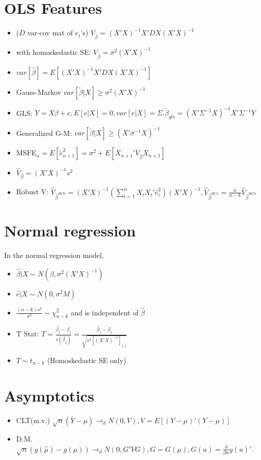 \documentclass[11pt]{article} %
\begin{document}
\section{OLS Features}
\begin{itemize}
\item ($D$ var-cov mat of $e_i$'s) $V_{\hat{\beta}} = (X'X)^{-1}X'DX(X'X)^{-1}$ 
\item with homoskedastic SE: $V_{\hat{\beta}} = \sigma^2 (X'X)^{-1}$
\item $var[\hat{\beta}] = E[(X'X)^{-1}X'DX(X'X)^{-1}]$
\item Gauss-Markov $var[\tilde{\beta} |X] \geq \sigma^2 (X'X)^{-1}$
\item GLS: $Y = X\beta + e, E[e|X] = 0, var[e|X] = \Sigma. \tilde{\beta}_{gls} = (X'\Sigma^{-1} X)^{-1} X'\Sigma ^{-1} Y$
\item Generalized G-M: $var[\tilde{\beta}|X] \geq (X'\sigma^{-1}X)^{-1}$
\item MSFE$_n = E[\tilde{e}_{n+1}^2] = \sigma^2 + E[X_{n+1}'V_{\hat{\beta}}X_{n+1}]$
\item $\hat{V}_{\hat{\beta}} = (X'X)^{-1} s^2$
\item Robust V: $\hat{V}_{\hat{\beta}^{HC0}} = (X'X)^{-1}\left( \sum_{i=1}^n X_i X_i' \hat{e}_i^2\right) (X'X)^{-1}, \hat{V}_{\hat{\beta}^{HC1}} = \frac{n}{n-k}\hat{V}_{\hat{\beta}^{HC0}} $
\end{itemize}

\section{Normal regression}
In the normal regression model,
\begin{itemize}
\item $\hat{\beta}|X \sim N(\beta,\sigma^2 (X'X)^{-1})$
\item $\hat{e}|X \sim N(0,\sigma^2M)$
\item $\frac{(n-k)s^2}{\sigma^2} \sim \chi^2_{n-k}$ and is independent of $\hat{\beta}$
\item T Stat: $T = \frac{\hat{\beta}_j - \beta_j}{s(\hat{\beta}_j)} = \frac{\hat{\beta}_j - \beta_j}{\sqrt{s^2[(X'X)^{-1}]_{j,j}}}$
\item $T \sim t_{n-k}$ (Homoskedastic SE only)
\end{itemize}

\section{Asymptotics}
\begin{itemize}
\item  CLT(m.v.) $\sqrt{n}(\bar{Y} - \mu) \rightarrow_d N(0,V), V = E[(Y-\mu)'(Y-\mu)]$
\item D.M. $\sqrt{n} (g(\hat{\mu}) - g(\mu)) \rightarrow_d N(0,G'VG), G = G(\mu), G(u) = \frac{\partial}{\partial u}g(u)'$.
\end{itemize}
\end{document}
